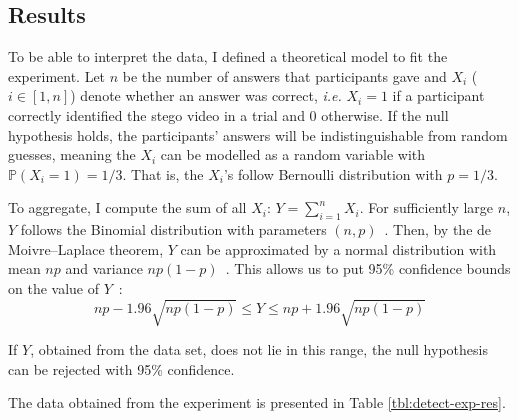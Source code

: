 \documentclass[12pt,british,twoside,notitlepage,usenames,dvipsnames,hypens,final]{report}
\numberwithin{equation}{section}
\numberwithin{figure}{section}
\begin{document}
\subsection{Results}

To be able to interpret the data, I defined a theoretical model to fit the experiment. Let $n$ be the number of answers that participants gave and $X_i$ ($i \in [1, n]$) denote whether an answer was correct, \emph{i.e.} $X_i = 1$ if a participant correctly identified the stego video in a trial and $0$ otherwise. If the null hypothesis holds, the participants' answers will be indistinguishable from random guesses, meaning the $X_i$ can be modelled as a random variable with $\mathbb{P}(X_i = 1) = 1/3$. That is, the $X_i$'s follow Bernoulli distribution with $p = 1/3$. 

To aggregate, I compute the sum of all $X_i$: $Y = \sum^n_{i=1} X_i$. For sufficiently large $n$, $Y$ follows the Binomial distribution with parameters $(n, p)$~\cite[p.~53]{papoulis2002probability}. Then, by the de Moivre--Laplace theorem, $Y$ can be approximated by a normal distribution with mean $np$ and variance $np(1-p)$~\cite[p.~105]{papoulis2002probability}. This allows us to put 95\% confidence bounds on the value of $Y$~\cite[p.~316--318]{ai2-notes}:
\[ np - 1.96 \sqrt{np(1-p)}  \leq Y \leq  np + 1.96 \sqrt{np(1-p)} \]

If $Y$, obtained from the data set, does not lie in this range, the null hypothesis can be rejected with 95\% confidence.

The data obtained from the experiment is presented in Table \ref{tbl:detect-exp-res}. 
\end{document}
